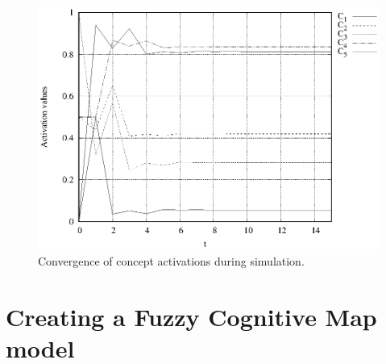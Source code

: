 \documentclass[graybox]{svmult}
\begin{document}
\begin{figure}[hbt]
  \sidecaption
  \includegraphics[scale=0.55]{simulation/simulation.eps}
  \caption{Convergence of concept activations during simulation.}
  \label{fig:exampleConvergence}
\end{figure}

\section{Creating a Fuzzy Cognitive Map model}



\end{document}
